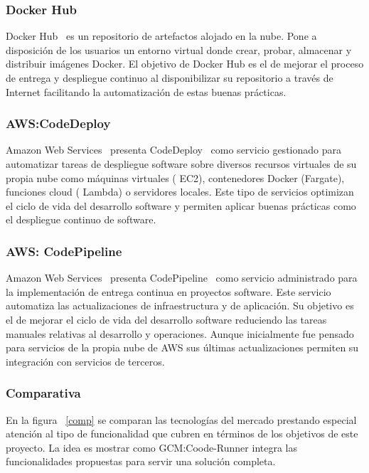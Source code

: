 \documentclass[a4paper,11pt]{book}
\begin{document}
\subsubsection{Docker Hub}

Docker Hub~\cite{dhub} es un repositorio de artefactos alojado en la nube. Pone a disposición de los usuarios un entorno virtual donde crear, probar, almacenar y distribuir imágenes Docker. El objetivo de Docker Hub es el de mejorar el proceso de entrega y despliegue continuo al disponibilizar su repositorio a través de Internet facilitando la automatización de estas buenas prácticas. 

\subsubsection{AWS:CodeDeploy}

Amazon Web Services~\cite{aws} presenta  CodeDeploy~\cite{awscode} como servicio gestionado para automatizar tareas de despliegue software sobre diversos recursos virtuales de su propia nube como máquinas virtuales ( EC2), contenedores Docker (Fargate), funciones cloud ( Lambda) o servidores locales. Este tipo de servicios optimizan el ciclo de vida del desarrollo software y permiten aplicar buenas prácticas como el despliegue continuo de software. 

\subsubsection{AWS: CodePipeline}
Amazon Web Services~\cite{aws} presenta  CodePipeline~\cite{awspipe} como servicio administrado para la implementación de entrega continua en proyectos software. Este servicio automatiza las actualizaciones de infraestructura y de aplicación. Su objetivo es el de mejorar el ciclo de vida del desarrollo software reduciendo las tareas manuales relativas al desarrollo y operaciones. Aunque inicialmente fue pensado para servicios de la propia nube de AWS sus últimas actualizaciones permiten su integración con servicios de terceros.  


\subsubsection{Comparativa}

En la figura ~\ref{comp} se comparan las tecnologías del mercado prestando especial atención al tipo de funcionalidad que cubren en términos de los objetivos de este proyecto. La idea es mostrar como GCM:Coode-Runner integra las funcionalidades propuestas para servir una solución completa.
\end{document}
